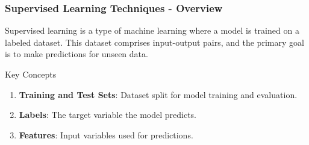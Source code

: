 \documentclass[aspectratio=169]{beamer}
\begin{document}
\begin{frame}[fragile]
    \frametitle{Supervised Learning Techniques - Overview}
    Supervised learning is a type of machine learning where a model is trained on a labeled dataset. This dataset comprises input-output pairs, and the primary goal is to make predictions for unseen data.
    
    \begin{block}{Key Concepts}
        \begin{enumerate}
            \item \textbf{Training and Test Sets}: Dataset split for model training and evaluation.
            \item \textbf{Labels}: The target variable the model predicts.
            \item \textbf{Features}: Input variables used for predictions.
        \end{enumerate}
    \end{block}
\end{frame}
\end{document}
